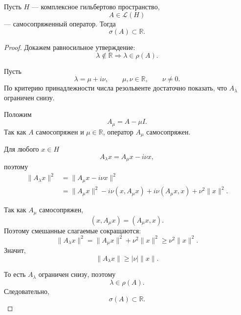 \begin{theorem}
	Пусть \(H\) --- комплексное гильбертово пространство,
	\[
	A\in\mathcal{L}(H)
	\]
	--- самосопряженный оператор. Тогда
	\[
	\sigma(A)\subset\mathbb{R}.
	\]
\end{theorem}

\begin{proof}
	Докажем равносильное утверждение:
	\[
	\lambda\notin\mathbb{R}
	\Longrightarrow
	\lambda\in\rho(A).
	\]
	
	Пусть
	\[
	\lambda=\mu+i\nu,
	\qquad
	\mu,\nu\in\mathbb{R},
	\qquad
	\nu\neq0.
	\]
	По критерию принадлежности числа резольвенте достаточно показать,
	что \(A_\lambda\) ограничен снизу.
	
	Положим
	\[
	A_\mu=A-\mu I.
	\]
	Так как \(A\) самосопряжен и \(\mu\in\mathbb{R}\),
	оператор \(A_\mu\) самосопряжен.
	
	Для любого \(x\in H\)
	\[
	A_\lambda x=A_\mu x-i\nu x,
	\]
	поэтому
	\[
	\begin{aligned}
		\|A_\lambda x\|^2
		&=
		\|A_\mu x-i\nu x\|^2
		\\
		&=
		\|A_\mu x\|^2
		-i\nu(x,A_\mu x)
		+i\nu(A_\mu x,x)
		+\nu^2\|x\|^2.
	\end{aligned}
	\]
	
	Так как \(A_\mu\) самосопряжен,
	\[
	(x,A_\mu x)=(A_\mu x,x).
	\]
	Поэтому смешанные слагаемые сокращаются:
	\[
	\|A_\lambda x\|^2
	=
	\|A_\mu x\|^2+\nu^2\|x\|^2
	\geqslant
	\nu^2\|x\|^2.
	\]
	Значит,
	\[
	\|A_\lambda x\|
	\geqslant
	|\nu|\|x\|.
	\]
	
	То есть \(A_\lambda\) ограничен снизу, поэтому
	\[
	\lambda\in\rho(A).
	\]
	Следовательно,
	\[
	\boxed{\sigma(A)\subset\mathbb{R}}.
	\]
\end{proof}
